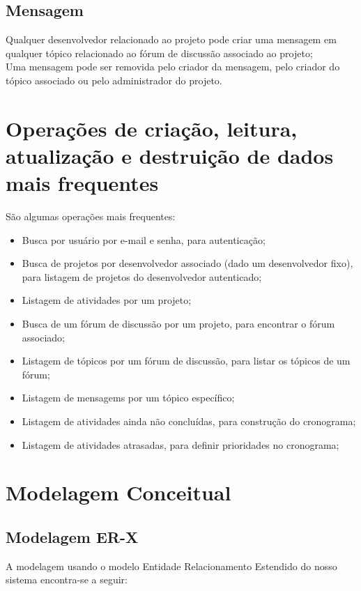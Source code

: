 \documentclass{article}
\begin{document}
	\subsection{Mensagem}
	Qualquer desenvolvedor relacionado ao projeto pode criar uma mensagem em qualquer tópico relacionado ao fórum de discussão associado ao projeto;\\
	Uma mensagem pode ser removida pelo criador da mensagem, pelo criador do tópico associado ou pelo administrador do projeto.


\section{Operações de criação, leitura, atualização e destruição de dados mais frequentes}

	São algumas operações mais frequentes:
	
	\begin{itemize}
		\item Busca por usuário por e-mail e senha, para autenticação;
		\item Busca de projetos por desenvolvedor associado (dado um desenvolvedor fixo), para listagem de projetos do desenvolvedor autenticado;
		\item Listagem de atividades por um projeto;
		\item Busca de um fórum de discussão por um projeto, para encontrar o fórum associado;
		\item Listagem de tópicos por um fórum de discussão, para listar os tópicos de um fórum;
		\item Listagem de mensagems por um tópico específico;
		\item Listagem de atividades ainda não concluídas, para construção do cronograma;
		\item Listagem de atividades atrasadas, para definir prioridades no cronograma;
	\end{itemize}

\section{Modelagem Conceitual}

	\subsection{Modelagem ER-X}
	A modelagem usando o modelo Entidade Relacionamento Estendido do nosso sistema encontra-se a seguir:
\end{document}
